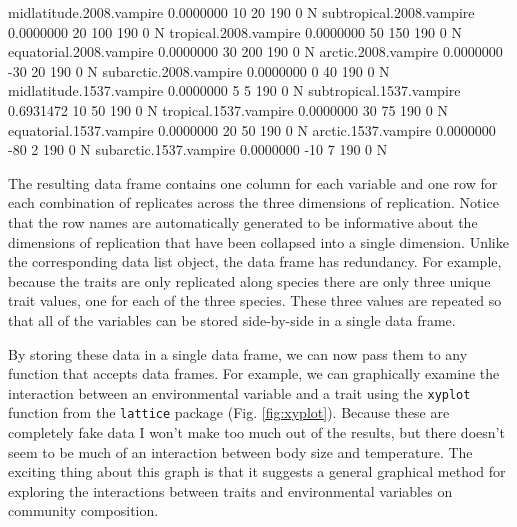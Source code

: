 \documentclass{article}
\newcommand{\code}[1]{\texttt{#1}}
\numberwithin{exercise}{section}
\begin{document}
\begin{Schunk}
\begin{Soutput}
midlatitude.2008.vampire  0.0000000          10            20       190              0          N
subtropical.2008.vampire  0.0000000          20           100       190              0          N
tropical.2008.vampire     0.0000000          50           150       190              0          N
equatorial.2008.vampire   0.0000000          30           200       190              0          N
arctic.2008.vampire       0.0000000         -30            20       190              0          N
subarctic.2008.vampire    0.0000000           0            40       190              0          N
midlatitude.1537.vampire  0.0000000           5             5       190              0          N
subtropical.1537.vampire  0.6931472          10            50       190              0          N
tropical.1537.vampire     0.0000000          30            75       190              0          N
equatorial.1537.vampire   0.0000000          20            50       190              0          N
arctic.1537.vampire       0.0000000         -80             2       190              0          N
subarctic.1537.vampire    0.0000000         -10             7       190              0          N
\end{Soutput}
\end{Schunk}


The resulting data frame contains one column for each variable and one row for each combination of replicates across the three dimensions of replication.  Notice that the row names are automatically generated to be informative about the dimensions of replication that have been collapsed into a single dimension.  Unlike the corresponding data list object, the data frame has redundancy.  For example, because the traits are only replicated along species there are only three unique trait values, one for each of the three species.  These three values are repeated so that all of the variables can be stored side-by-side in a single data frame.

By storing these data in a single data frame, we can now pass them to any function that accepts data frames.  For example, we can graphically examine the interaction between an environmental variable and a trait using the \code{xyplot} function from the \code{lattice} package (Fig. \ref{fig:xyplot}).  Because these are completely fake data I won't make too much out of the results, but there doesn't seem to be much of an interaction between body size and temperature.  The exciting thing about this graph is that it suggests a general graphical method for exploring the interactions between traits and environmental variables on community composition.
\end{document}
